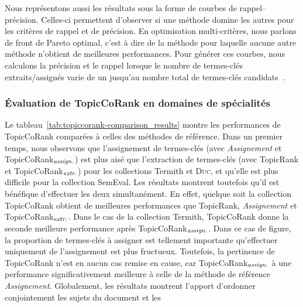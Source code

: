         Nous représentons aussi les résultats sous la forme de courbes de
        rappel--précision. Celles-ci permettent d'observer si une méthode domine
        les autres pour les critères de rappel et de précision. En optimisation
        multi-critères, nous parlons de front de Pareto optimal, c'est à dire de
        la méthode pour laquelle aucune autre méthode n'obtient de meilleures
        performances. Pour générer ces courbes, nous calculons la précision et
        le rappel lorsque  le nombre de termes-clés extraits/assignés varie de
        un jusqu'au nombre total de termes-clés
        candidats~\cite{hassan2010conundrums}.
      
      \subsubsection{Évaluation de TopicCoRank en domaines de spécialités}
      \label{subsubsec:main-domain_specific_keyphrase_annotation-supervised_automatic_keyphrase_annotation-evaluation-topiccorank_specific_domains}
        Le tableau~\ref{tab:topiccorank-comparison_results} montre les
        performances de TopicCoRank comparées à celles des méthodes de
        référence. Dans un premier temps, nous observons que l'assignement de
        termes-clés (avec \textit{Assignement} et
        TopicCoRank$_\textnormal{\textit{assign.}}$) est plus aisé que
        l'extraction de termes-clés (avec TopicRank et
        TopicCoRank$_\textnormal{\textit{extr.}}$) pour les collections Termith
        et \textsc{Duc}, et qu'elle est plus difficile pour la collection
        SemEval. Les résultats montrent toutefois qu'il est bénéfique
        d'effectuer les deux simultanément. En effet, quelque soit la collection
        TopicCoRank obtient de meilleures performances que TopicRank,
        \textit{Assignement} et TopicCoRank$_\textnormal{\textit{extr.}}$. Dans
        le cas de la collection Termith, TopicCoRank donne la seconde meilleure
        performance après TopicCoRank$_\textnormal{\textit{assign.}}$. Dans ce
        cas de figure, la proportion de termes-clés \og{}à assigner\fg{} est
        tellement importante qu'effectuer uniquement de l'assignement est plus
        fructueux. Toutefois, la pertinence de TopicCoRank n'est en aucun cas
        remise en cause, car TopicCoRank$_\textnormal{\textit{assign.}}$ à une
        performance significativement meilleure à celle de la méthode de
        référence \textit{Assignement}. Globalement, les résultats montrent
        l'apport d'ordonner conjointement les sujets du document et les
